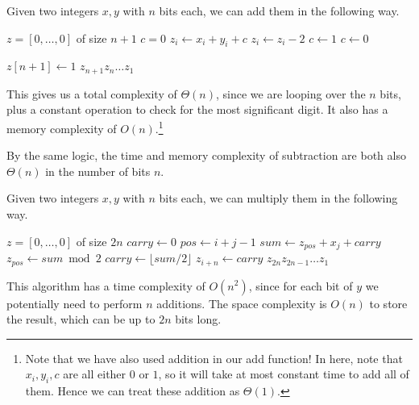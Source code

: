   \begin{algo}
    Given two integers $x, y$ with $n$ bits each, we can add them in the following way. 
    \begin{algorithmic}[1]  

        \State $z = [0, \ldots, 0]$ of size $n+1$  
        \State $c = 0$ 
          \State $z_i \gets x_i + y_i + c$ 
            \State $z_i \gets z_i - 2$ 
            \State $c \gets 1$
          \Else 
            \State $c \gets 0$
          \EndIf  
        \EndFor 
        
          \State $z[n+1] \gets 1$  
        \EndIf
      \State \Return $z_{n+1} z_n \ldots z_1$
      \EndProcedure
    \end{algorithmic} 

    This gives us a total complexity of $\Theta(n)$, since we are looping over the $n$ bits, plus a constant operation to check for the most significant digit. It also has a memory complexity of $O(n)$.\footnote{Note that we have also used addition in our add function! In here, note that $x_i, y_i, c$ are all either $0$ or $1$, so it will take at most constant time to add all of them. Hence we can treat these addition as $\Theta(1)$. } 
  \end{algo} 

  By the same logic, the time and memory complexity of subtraction are both also $\Theta(n)$ in the number of bits $n$. 

  \begin{algo}
    Given two integers $x, y$ with $n$ bits each, we can multiply them in the following way.
    \begin{algorithmic}[1]  
        \State $z = [0, \ldots, 0]$ of size $2n$  
            \State $carry \gets 0$
              \State $pos \gets i + j - 1$ 
              \State $sum \gets z_{pos} + x_j + carry$
              \State $z_{pos} \gets sum \bmod 2$
              \State $carry \gets \lfloor sum / 2 \rfloor$
            \EndFor
            \State $z_{i+n} \gets carry$
          \EndIf
        \EndFor
      \State \Return $z_{2n} z_{2n-1} \ldots z_1$
      \EndProcedure
    \end{algorithmic} 
    This algorithm has a time complexity of $O(n^2)$, since for each bit of $y$ we potentially need to perform $n$ additions. The space complexity is $O(n)$ to store the result, which can be up to $2n$ bits long. 
  \end{algo}

